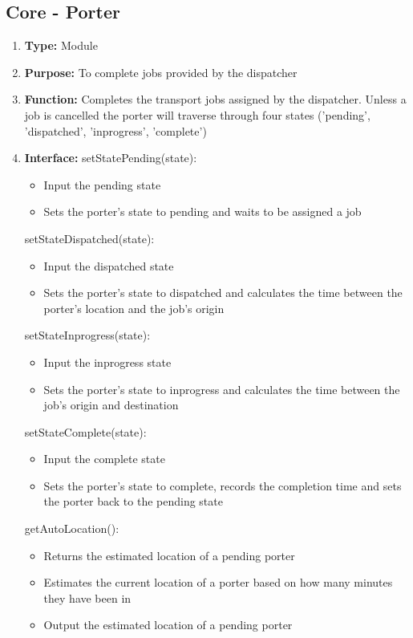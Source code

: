 \documentclass[paper=letter, fontsize=10pt]{scrartcl}
\numberwithin{equation}{section}		%
\numberwithin{figure}{section}			%
\numberwithin{table}{section}				%
\begin{document}
\subsection{Core - Porter}
\begin{enumerate}[]
	\item \textbf{Type:} Module
	\item \textbf{Purpose:}  To complete jobs provided by the dispatcher
	\item \textbf{Function:} Completes the transport jobs assigned by the dispatcher.  Unless a job is cancelled the porter will traverse through four states ('pending', 'dispatched', 'inprogress', 'complete')
	\item \textbf{Interface:} \newline
	setStatePending(state):
		\begin{itemize}
			\item Input the pending state
			\item Sets the porter's state to pending and waits to be assigned a job
		\end{itemize}
	setStateDispatched(state):
		\begin{itemize}
			\item Input the dispatched state
			\item Sets the porter's state to dispatched and calculates the time between the porter's location and the job's origin	
		\end{itemize}
	setStateInprogress(state):
		\begin{itemize}
			\item Input the inprogress state
			\item Sets the porter's state to inprogress and calculates the time between the job's origin and destination
		\end{itemize}
	setStateComplete(state):
		\begin{itemize}
			\item Input the complete state
			\item Sets the porter's state to complete, records the completion time and sets the porter back to the pending state
		\end{itemize}
	getAutoLocation():
		\begin{itemize}
			\item Returns the estimated location of a pending porter
			\item Estimates the current location of a porter based on how many minutes they have been in 
			\item Output the estimated location of a pending porter

\end{itemize}
\end{enumerate}
\end{document}

